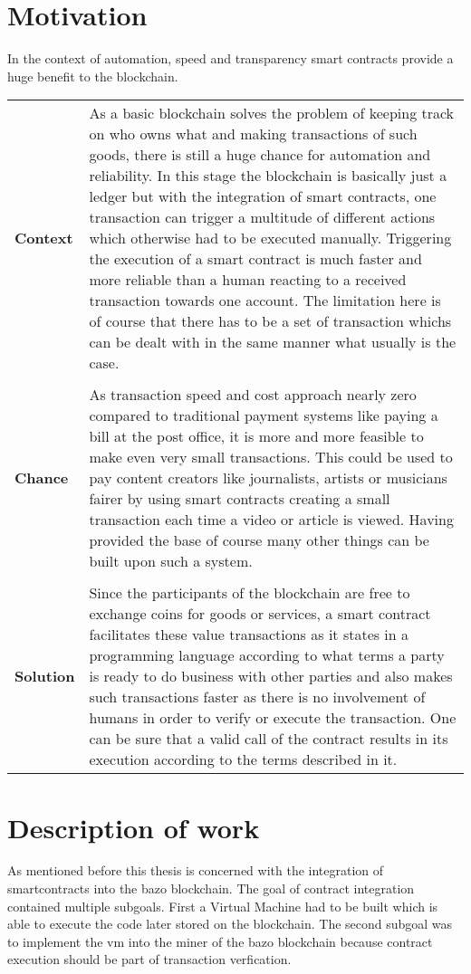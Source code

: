 \section{Motivation}
In the context of automation, speed and transparency smart contracts provide a huge benefit to the blockchain.

\begin{tabular}[t]{ p{3cm} p{12.5cm}}
\textbf{Context} & 
As a basic blockchain solves the problem of keeping track on who owns what and making transactions of such goods, there is still a huge chance for automation and reliability. In this stage the blockchain is basically just a ledger but with the integration of smart contracts, one transaction can trigger a multitude of different actions which otherwise had to be executed manually. Triggering the execution of a smart contract is much faster and more reliable than a human reacting to a received transaction towards one account. The limitation here is of course that there has to be a set of transaction whichs can be dealt with in the same manner what usually is the case. \\ \\

\textbf{Chance} & 
As transaction speed and cost approach nearly zero compared to traditional payment systems like paying a bill at the post office, it is more and more feasible to make even very small transactions. This could be used to pay content creators like journalists, artists or musicians fairer by using smart contracts creating a small transaction each time a video or article is viewed.
Having provided the base of course many other things can be built upon such a system.\\ \\

\textbf{Solution} & 
Since the participants of the blockchain are free to exchange coins for goods or services, a smart contract facilitates these value transactions as it states in a programming language according to what terms a party is ready to do business with other parties and also makes such transactions faster as there is no involvement of humans in order to verify or execute the transaction. One can be sure that a valid call of the contract results in its execution according to the terms described in it.
\end{tabular}

\section{Description of work}
As mentioned before this thesis is concerned with the integration of smartcontracts into the bazo blockchain. The goal of contract integration contained multiple subgoals. First a Virtual Machine had to be built which is able to execute the code later stored on the blockchain. The second subgoal was to implement the vm into the miner of the bazo blockchain because contract execution should be part of transaction verfication.